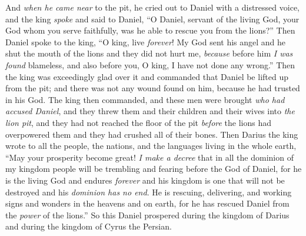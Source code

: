 \begin{biblechapter}
\verse And \textit{when he came near} to the pit, he cried out to Daniel with a distressed voice, and the king \textit{spoke} and said to Daniel, “O Daniel, servant of the living God, your God whom you serve faithfully, was he able to rescue you from the lions?”
\verse Then Daniel spoke to the king, “O king, live \textit{forever}!
\verse My God sent his angel and he shut the mouth of the lions and they did not hurt me, \textit{because} before him \textit{I was found} blameless, and also before you, O king, I have not done any wrong.”
\verse Then the king was exceedingly glad over it and commanded that Daniel be lifted up from the pit; and there was not any wound found on him, because he had trusted in his God.
\verse The king then commanded, and these men were brought \textit{who had accused Daniel}, and they threw them and their children and their wives into \textit{the lion pit}, and they had not reached the floor of the pit \textit{before} the lions had overpowered them and they had crushed all of their bones.
 Then Darius the king wrote to all the people, the nations, and the languages living in the whole earth, “May your prosperity become great!
\verse \textit{I make a decree} that in all the dominion of my kingdom people will be trembling and fearing before the God of Daniel, for he is the living God and endures \textit{forever} and his kingdom is one that will not be destroyed and his \textit{dominion has no end}.
\verse He is rescuing, delivering, and working signs and wonders in the heavens and on earth, for he has rescued Daniel from the \textit{power} of the lions.”
\verse So this Daniel prospered during the kingdom of Darius and during the kingdom of Cyrus the Persian.
\end{biblechapter}

